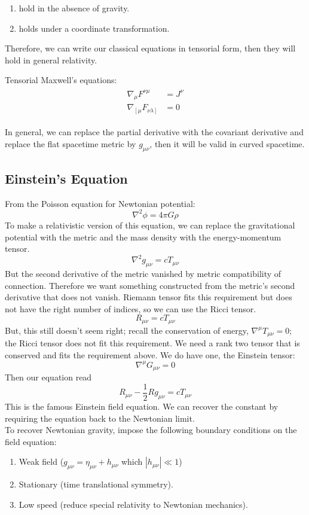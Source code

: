 \documentclass[12pt]{article}
\theoremstyle{mystyle}{\newtheorem{definition}{Definition}[subsection]}
\theoremstyle{mystyle}{\newtheorem{theorem}[definition]{Theorem}}
\theoremstyle{mystyle}{\newtheorem*{remark}{Remark}}
\theoremstyle{mystyle}{\newtheorem{example}{Example}[subsection]}
\theoremstyle{mystyle}{\newtheorem{examples}{Examples}[subsection]}
\theoremstyle{mystyle}{\newtheorem{cthm}{}[subsection]}
\begin{document}
\begin{enumerate}
  \item hold in the absence of gravity.
  \item holds under a coordinate transformation.
\end{enumerate}
Therefore, we can write our classical equations in tensorial form, then they will hold in general relativity.

\begin{example}
  Tensorial Maxwell's equations:
  \begin{align*}
    \begin{split}
      \nabla_{\mu}F^{\nu\mu} &= J^{\nu}\\
      \nabla_{\left[ \mu\right.}F_{\left. \nu\lambda \right]} &= 0
    \end{split}
  \end{align*}
\end{example}

In general, we can replace the partial derivative with the covariant derivative and replace the flat spacetime metric by \(g_{\mu\nu}\),
then it will be valid in curved spacetime.



\subsection{Einstein's Equation}
From the Poisson equation for Newtonian potential:
\[\nabla^2 \phi = 4 \pi G \rho\]
To make a relativistic version of this equation, we can replace the gravitational potential with the metric and the mass density with the energy-momentum tensor.
\[\nabla^2 g_{\mu\nu} = c T_{\mu\nu}\]
But the second derivative of the metric vanished by metric compatibility of connection. Therefore we want something constructed from the metric's second derivative that does not vanish.
Riemann tensor fits this requirement but does not have the right number of indices, so we can use the Ricci tensor.
\[R_{\mu\nu} = c T_{\mu\nu}\]
But, this still doesn't seem right; recall the conservation of energy, \(\nabla^{\mu}T_{\mu\nu} = 0\); the Ricci tensor does not fit this requirement.
We need a rank two tensor that is conserved and fits the requirement above. We do have one, the Einstein tensor:
\[\nabla^{\mu}G_{\mu\nu} = 0\]
Then our equation read \[R_{\mu\nu} -\frac{1}{2}Rg_{\mu\nu} = cT_{\mu\nu}\]
This is the famous Einstein field equation. We can recover the constant by requiring the equation back to the Newtonian limit.\\
To recover Newtonian gravity, impose the following boundary conditions on the field equation:
\begin{enumerate}
  \item Weak field (\(g_{\mu\nu} = \eta_{\mu\nu} + h_{\mu\nu}\) which \(\left|h_{\mu\nu}\right| \ll 1\))
  \item Stationary (time translational symmetry).
  \item Low speed (reduce special relativity to Newtonian mechanics).
\end{enumerate}
\end{document}
